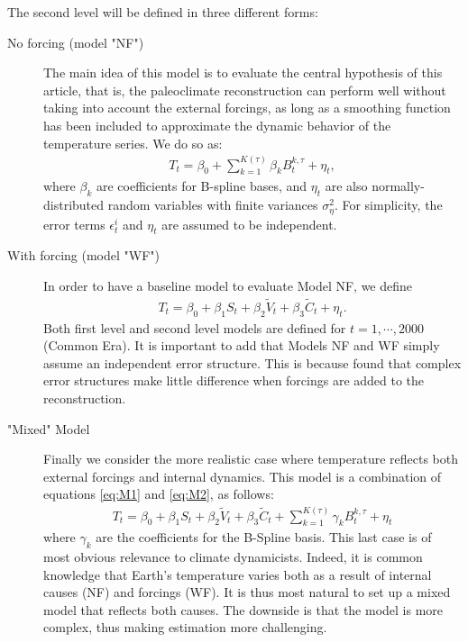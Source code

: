 \documentclass[12pt]{amsart}
\theoremstyle{plain}
\theoremstyle{definition}
\theoremstyle{remark}
\newcommand{\lb}[1]{\color{MidnightBlue}\textbf{[LB: #1]}\normalcolor}
\newcommand{\jeg}[1]{\color{ProcessBlue}\textbf{[JEG: #1]}\normalcolor}
\begin{document}
The second level will be defined in three different forms:
\begin{description}
\item[No forcing (model "NF")]
The main idea of this model is to evaluate the
central hypothesis of this article, that is, the paleoclimate reconstruction can
perform  well without taking into account the external forcings, as long as a
smoothing function has been included to approximate the dynamic behavior of the temperature series. We do so as: 
  \begin{align}\label{eq:M1}
    T_t=\beta_0+\sum_{k=1}^{K(\tau)}\beta_k B_t^{k,\tau}+\eta_t,
  \end{align}
where $\beta_k$ are coefficients for B-spline bases, and
$\eta_t$ are also normally-distributed random variables with finite variances
$\sigma^2_{\eta}$. For simplicity, the error terms $\epsilon^i_t$ and $\eta_t$
are assumed to be independent.  
\item[With forcing (model "WF")]
In order to have a baseline model to evaluate Model NF, we
define
  \begin{align}\label{eq:M2}
    T_t=\beta_0+\beta_1S_t+\beta_2\tilde V_t+\beta_3\tilde C_t+\eta_t.
  \end{align}
Both first level and second level models are defined for
$t=1,\cdots,2000$ (Common Era). It is important to add that Models NF and WF simply assume an independent error structure. This is because \cite{Barboza2014} 
found that complex error structures make little difference when forcings are added to the reconstruction.
\item["Mixed" Model] 
\vskip 0.25in
Finally we consider the more realistic case where temperature reflects both external forcings and internal dynamics. This model is a combination of equations \eqref{eq:M1} and \eqref{eq:M2}, as follows:
  \begin{align}\label{eq:M3}
    T_t=\beta_0+\beta_1S_t+\beta_2\tilde V_t+\beta_3\tilde C_t+\sum_{k=1}^{K(\tau)}\gamma_k B_t^{k,\tau}+\eta_t
  \end{align}
  where $\gamma_k$ are the coefficients for the B-Spline basis. %
  This last case is of most obvious relevance to climate dynamicists. Indeed, it is common knowledge that Earth's temperature varies both as a result of internal causes (NF) and forcings (WF). It is thus most natural to set up a mixed model that reflects both causes. The downside is that the model is more complex, thus making estimation more challenging. 
\end{description}
\end{document}
